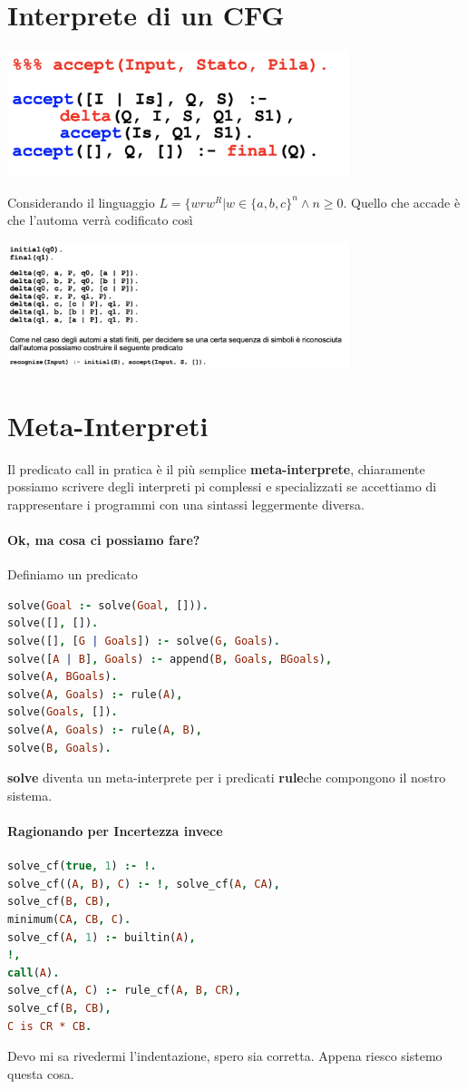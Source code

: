 \documentclass[12pt, a4paper, openany, oneside]{book}
\begin{document}
\section{Interprete di un CFG}
\begin{center}
\includegraphics[width=0.75\textwidth]{acceptpila}
\end{center}
Considerando il linguaggio $L=\{wrw^{R}|w \in\{a,b,c\}^{n} \wedge n\geq0$.
Quello che accade è che l'automa verrà codificato così
\begin{center}
\includegraphics[width=0.75\textwidth]{codificaauto}
\end{center}
\section{Meta-Interpreti}
Il predicato call in pratica è il più semplice \textbf{meta-interprete},
chiaramente possiamo scrivere degli interpreti pi complessi e specializzati
se accettiamo di rappresentare i programmi con una sintassi leggermente 
diversa.
\paragraph{Ok, ma cosa ci possiamo fare? }Definiamo un predicato 
\begin{lstlisting}[language=Prolog]
solve(Goal :- solve(Goal, [])).
solve([], []).
solve([], [G | Goals]) :- solve(G, Goals). 
solve([A | B], Goals) :- append(B, Goals, BGoals),
solve(A, BGoals). 
solve(A, Goals) :- rule(A),
solve(Goals, []). 
solve(A, Goals) :- rule(A, B), 
solve(B, Goals).
\end{lstlisting}
\textbf{solve} diventa un meta-interprete per i predicati \textbf{rule}che
compongono il nostro sistema.
\paragraph{Ragionando per Incertezza invece}
\begin{lstlisting}[language=Prolog]
solve_cf(true, 1) :- !.
solve_cf((A, B), C) :- !, solve_cf(A, CA), 
solve_cf(B, CB),
minimum(CA, CB, C).
solve_cf(A, 1) :- builtin(A), 
!, 
call(A).
solve_cf(A, C) :- rule_cf(A, B, CR), 
solve_cf(B, CB), 
C is CR * CB.
\end{lstlisting}	
Devo mi sa rivedermi l'indentazione, spero sia corretta. 
Appena riesco sistemo questa cosa.
\end{document}
